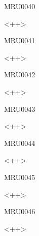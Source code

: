 \documentclass{article}
\begin{document}
\begin{corrige}{MRU0040}

<++>

\end{corrige}%


\begin{corrige}{MRU0041}

<++>

\end{corrige}%


\begin{corrige}{MRU0042}

<++>

\end{corrige}%


\begin{corrige}{MRU0043}

<++>

\end{corrige}%


\begin{corrige}{MRU0044}

<++>

\end{corrige}%


\begin{corrige}{MRU0045}

<++>

\end{corrige}%


\begin{corrige}{MRU0046}

<++>

\end{corrige}%
\end{document}
